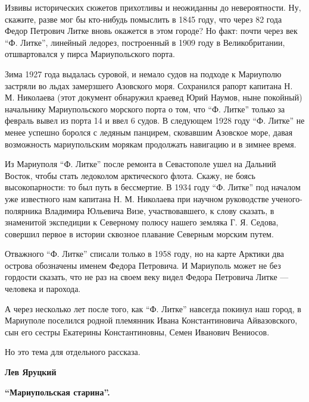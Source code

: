 Извивы исторических сюжетов прихотливы и неожиданны до невероятности. Ну,
скажите, разве мог бы кто-нибудь помыслить в 1845 году, что через 82 года
Федор Петрович Литке вновь окажется в этом городе? Но факт: почти через век \enquote{Ф.
Литке}, линейный ледорез, построенный в 1909 году в Великобритании,
отшвартовался у пирса Мариупольского порта.

Зима 1927 года выдалась суровой, и немало судов на подходе к Мариуполю застряли
во льдах замерзшего Азовского моря. Сохранился рапорт капитана Н. М. Николаева
(этот документ обнаружил краевед Юрий Наумов, ныне покойный) начальнику
Мариупольского морского порта о том, что \enquote{Ф. Литке} только за февраль вывел из
порта 14 и ввел 6 судов. В следующем 1928 году \enquote{Ф. Литке} не менее успешно
боролся с ледяным панцирем, сковавшим Азовское море, давая возможность
мариупольским морякам продолжать навигацию и в зимнее время.

Из Мариуполя \enquote{Ф. Литке} после ремонта в Севастополе ушел на Дальний Восток,
что­бы стать ледоколом арктического флота. Скажу, не боясь высокопарности: то
был путь в бессмертие. В 1934 году \enquote{Ф. Литке} под началом уже известного нам
капитана Н. М. Николаева при научном руководстве ученого-полярника Владимира
Юльевича Визе, участво­вавшего, к слову сказать, в знаменитой экспедиции к
Северному полюсу нашего земляка Г. Я. Седова, совершил первое в истории
сквозное плавание Северным морским путем.

Отважного \enquote{Ф. Литке} списали только в 1958 году, но на карте Арктики два
острова обозначены именем Федора Петровича. И Мариуполь может не без гордости
сказать, что не раз на своем веку видел Федора Петровича Литке — человека и
парохода.

А через несколько лет после того, как \enquote{Ф. Литке} навсегда покинул наш город, в
Мариуполе поселился родной племянник Ивана Константиновича Айвазовского, сын
его сестры Екатерины Константиновны, Семен Иванович Вениосов.

Но это тема для отдельного рассказа.

\vspace{0.5cm}
\textbf{Лев Яруцкий}
\vspace{0.5cm}

\textbf{\enquote{Мариупольская старина}.}
